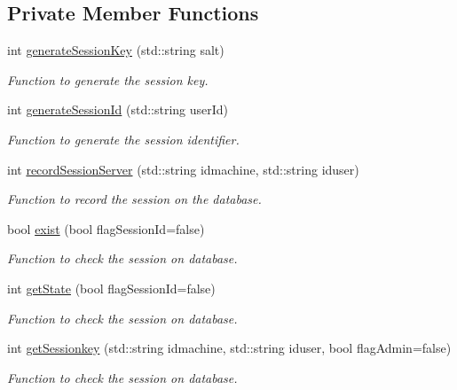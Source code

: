 \subsection*{Private Member Functions}
\begin{DoxyCompactItemize}
\item 
int \hyperlink{classSessionServer_a2e33c0fefafc3cf9256a031b648fe20d}{generateSessionKey} (std::string salt)
\begin{DoxyCompactList}\small\item\em Function to generate the session key. \item\end{DoxyCompactList}\item 
int \hyperlink{classSessionServer_a1e183bdc40894f3ed77ec57c75d8201f}{generateSessionId} (std::string userId)
\begin{DoxyCompactList}\small\item\em Function to generate the session identifier. \item\end{DoxyCompactList}\item 
int \hyperlink{classSessionServer_a1485d4253466f28c4191210ea843a7d9}{recordSessionServer} (std::string idmachine, std::string iduser)
\begin{DoxyCompactList}\small\item\em Function to record the session on the database. \item\end{DoxyCompactList}\item 
bool \hyperlink{classSessionServer_af9416a5a26dcb63589480a73a1d60cf1}{exist} (bool flagSessionId=false)
\begin{DoxyCompactList}\small\item\em Function to check the session on database. \item\end{DoxyCompactList}\item 
int \hyperlink{classSessionServer_a297167a64f374c538e8f7a719c5771e7}{getState} (bool flagSessionId=false)
\begin{DoxyCompactList}\small\item\em Function to check the session on database. \item\end{DoxyCompactList}\item 
int \hyperlink{classSessionServer_aa31001984aba984a1374e4088ffbbb6f}{getSessionkey} (std::string idmachine, std::string iduser, bool flagAdmin=false)
\begin{DoxyCompactList}\small\item\em Function to check the session on database. \item\end{DoxyCompactList}\item 

\end{DoxyCompactItemize}
